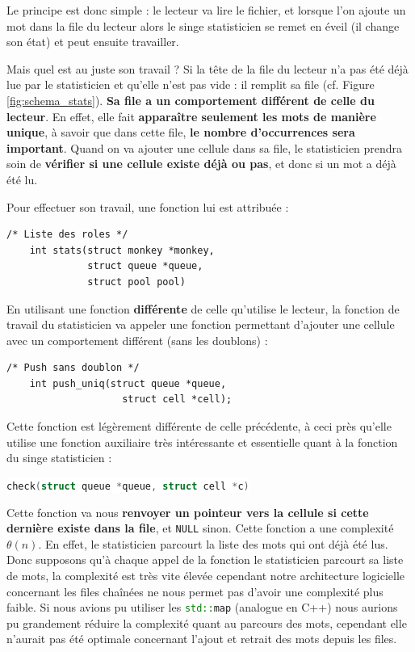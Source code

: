 \documentclass{article}
\newcommand{\inlinecode}[2]{\colorbox{white}{\lstinline[language=#1]$#2$}}
\begin{document}
Le principe est donc simple : le lecteur va lire le fichier, et lorsque l'on ajoute un mot dans la file du lecteur alors le singe statisticien se remet en éveil (il change son état) et peut ensuite travailler.

Mais quel est au juste son travail ? Si la tête de la file du lecteur n'a pas été déjà lue par le statisticien et qu'elle n'est pas vide : il remplit sa file (cf. Figure \ref{fig:schema_stats}). \textbf{Sa file a un comportement différent de celle du lecteur}. En effet, elle fait \textbf{apparaître seulement les mots de manière unique}, à savoir que dans cette file, \textbf{le nombre d'occurrences sera important}. Quand on va ajouter une cellule dans sa file, le statisticien prendra soin de \textbf{vérifier si une cellule existe déjà ou pas}, et donc si un mot a déjà été lu.

Pour effectuer son travail, une fonction lui est attribuée :
\begin{lstlisting}
/* Liste des roles */
    int stats(struct monkey *monkey,
              struct queue *queue,
              struct pool pool) 
\end{lstlisting}

En utilisant une fonction \textbf{différente} de celle qu'utilise le lecteur, la fonction de travail du statisticien va appeler une fonction permettant d'ajouter une cellule avec un comportement différent (sans les doublons) :

\begin{lstlisting}
/* Push sans doublon */
    int push_uniq(struct queue *queue,
                    struct cell *cell);
\end{lstlisting}
\label{lst:push_uniq_explications}

Cette fonction est légèrement différente de celle précédente, à ceci près qu'elle utilise une fonction auxiliaire très intéressante et essentielle quant à la fonction du singe statisticien :

\inlinecode{C}{check(struct queue *queue, struct cell *c)}
\label{lst:check_explications}

Cette fonction va nous \textbf{renvoyer un pointeur vers la cellule si cette dernière existe dans la file}, et \inlinecode{C}{NULL} sinon. Cette fonction a une complexité $\theta(n)$. En effet, le statisticien parcourt la liste des mots qui ont déjà été lus. Donc supposons qu'à chaque appel de la fonction le statisticien parcourt sa liste de mots, la complexité est très vite élevée cependant notre architecture logicielle concernant les files chaînées ne nous permet pas d'avoir une complexité plus faible. Si nous avions pu utiliser les \inlinecode{C++}{std::map} (analogue en C++) nous aurions pu grandement réduire la complexité quant au parcours des mots, cependant elle n'aurait pas été optimale concernant l'ajout et retrait des mots depuis les files.
\end{document}
